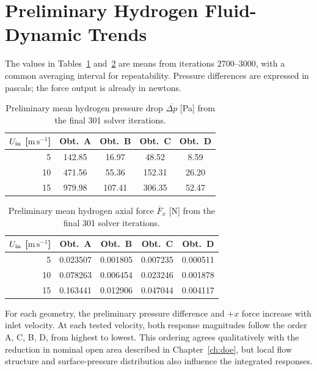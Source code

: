 \section{Preliminary Hydrogen Fluid-Dynamic Trends}
\label{sec:fluid_trends}

The values in Tables~\ref{tab:hydrogen_pressure} and~\ref{tab:hydrogen_force} are means from iterations 2700--3000, with a common averaging interval for repeatability. Pressure differences are expressed in pascals; the force output is already in newtons.

\begin{table}[htbp]
\centering
\begin{tabular}{@{}rcccc@{}}
\toprule
$U_{\rm in}$ [$\mathrm{m\,s^{-1}}$] & \textbf{Obt.\ A} & \textbf{Obt.\ B} & \textbf{Obt.\ C} & \textbf{Obt.\ D}\\
\midrule
5  & 142.85 & 16.97 & 48.52 & 8.59\\
10 & 471.56 & 55.36 & 152.31 & 26.20\\
15 & 979.98 & 107.41 & 306.35 & 52.47\\
\bottomrule
\end{tabular}
\caption{Preliminary mean hydrogen pressure drop $\overline{\Delta p}$ [Pa] from the final 301 solver iterations.}
\label{tab:hydrogen_pressure}

\end{table}

\begin{table}[htbp]
\centering
\begin{tabular}{@{}rcccc@{}}
\toprule
$U_{\rm in}$ [$\mathrm{m\,s^{-1}}$] & \textbf{Obt.\ A} & \textbf{Obt.\ B} & \textbf{Obt.\ C} & \textbf{Obt.\ D}\\
\midrule
5  & 0.023507 & 0.001805 & 0.007235 & 0.000511\\
10 & 0.078263 & 0.006454 & 0.023246 & 0.001878\\
15 & 0.163441 & 0.012906 & 0.047044 & 0.004117\\
\bottomrule
\end{tabular}
\caption{Preliminary mean hydrogen axial force $\overline{F}_x$ [N] from the final 301 solver iterations.}
\label{tab:hydrogen_force}

\end{table}

For each geometry, the preliminary pressure difference and $+x$ force increase with inlet velocity. At each tested velocity, both response magnitudes follow the order A, C, B, D, from highest to lowest. This ordering agrees qualitatively with the reduction in nominal open area described in Chapter~\ref{ch:doe}, but local flow structure and surface-pressure distribution also influence the integrated responses.

